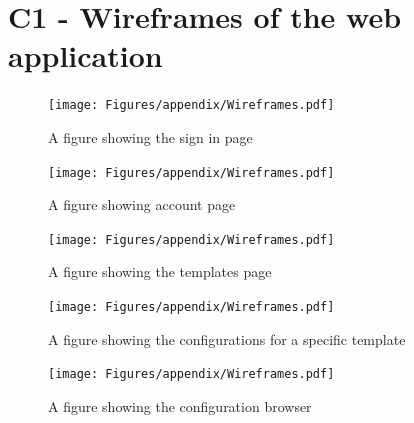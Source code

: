 \newpage
\section*{\large{C1 - Wireframes of the web application}}\label{wireframes:header}
\vspace*{1cm}

\begin{figure}[!ht]
    \begin{minipage}{1\textwidth}
         \centering
      \texttt{[image: Figures/appendix/Wireframes.pdf]}
     \caption[Sign in page wireframes]{A figure showing the sign in page}\label{wireframes:signin}
    \end{minipage}\hfill
\end{figure}

\vspace{1cm}

\begin{figure}[!ht]
    \begin{minipage}{1\textwidth}
         \centering
      \texttt{[image: Figures/appendix/Wireframes.pdf]}
     \caption[Account page wireframes]{A figure showing account page}\label{wireframes:account}
    \end{minipage}\hfill
\end{figure}


\begin{figure}[!ht]
    \begin{minipage}{1\textwidth}
         \centering
      \texttt{[image: Figures/appendix/Wireframes.pdf]}
     \caption[Templates page wireframes]{A figure showing the templates page}\label{wireframes:homescreen}
    \end{minipage}\hfill
\end{figure}

\vspace{1cm}

\begin{figure}[!ht]
    \begin{minipage}{1\textwidth}
         \centering
      \texttt{[image: Figures/appendix/Wireframes.pdf]}
     \caption[Configurations page wireframes]{A figure showing the configurations for a specific template}\label{wireframes:template}
    \end{minipage}\hfill
\end{figure}



\begin{figure}[!ht]
    \begin{minipage}{1\textwidth}
         \centering
      \texttt{[image: Figures/appendix/Wireframes.pdf]}
     \caption[Configuration browser wireframes]{A figure showing the configuration browser}
     \label{wireframes:configurationbrowser}
    \end{minipage}\hfill
\end{figure}

